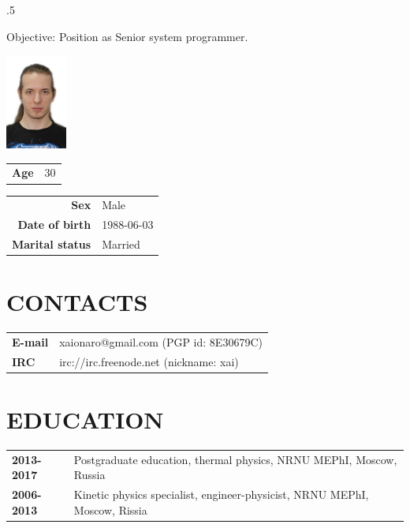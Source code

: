 \address{Limassol, Cyprus}


\begin{resume}
\vspace{0.1in}
\moveleft.5\sectionwidth\centerline{Objective: Position as Senior system programmer.}

\vspace{-6.5em}
\flushright
\includegraphics[width=20mm]{photo.jpg}\\
\begin{tabular}{ll}
 {\bf Age} & 30\\
\end{tabular}
\flushleft

\vspace{-5.5em}
\begin{tabular}{rl}
 {\bf Sex}            & Male\\
 {\bf Date of birth}  & 1988-06-03\\
 {\bf Marital status} & Married\\
\end{tabular}

\section{CONTACTS}
\vspace{0.1in} 
\begin{tabular}{ll}
 {\bf E-mail} & xaionaro@gmail.com (PGP id: 8E30679C)\\
 {\bf IRC}    & irc://irc.freenode.net (nickname: xai)\\
\end{tabular}

\section{EDUCATION}
\vspace{0.1in} 
\begin{tabular}{ll}
 {\bf 2013-2017} & Postgraduate education, thermal physics, NRNU MEPhI, Moscow, Russia\\
 {\bf 2006-2013} & Kinetic physics specialist, engineer-physicist, NRNU MEPhI, Moscow, Rissia\\
\end{tabular}


\end{resume}
